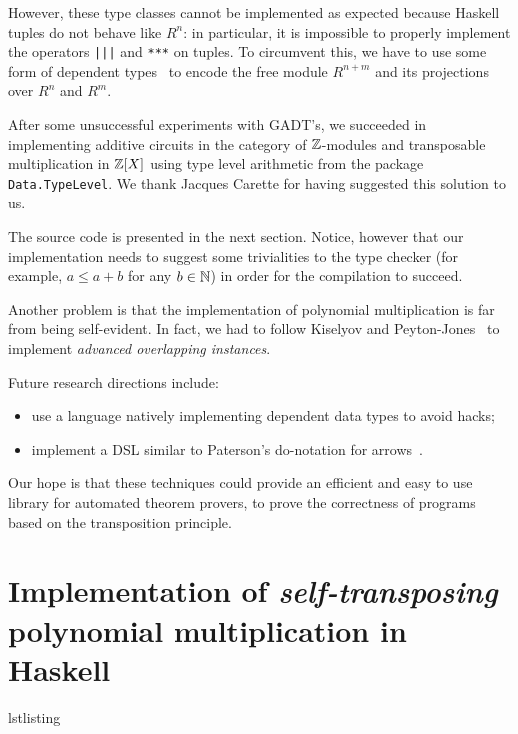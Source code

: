 However, these type classes cannot be implemented as expected because
Haskell tuples do not behave like $R^n$: in particular, it is
impossible to properly implement the operators \lstinline+|||+ and
\lstinline+***+ on tuples. To circumvent this, we have to use some
form of dependent types~\cite{kiselyov+lammel+schupke04,mcbride01} to
encode the free module $R^{n+m}$ and its projections over $R^n$ and
$R^m$.

After some unsuccessful experiments with GADT's, we succeeded in
implementing additive circuits in the category of $\mathbb{Z}$-modules and
transposable multiplication in $\mathbb{Z}[X]$ using type level arithmetic
from the package \lstinline+Data.TypeLevel+. We thank Jacques Carette
for having suggested this solution to us.

The source code is presented in the next section. Notice, however that
our implementation needs to suggest some trivialities to the type
checker (for example, $a\le a+b$ for any $b\in\mathbb{N}$) in order for the
compilation to succeed. 

Another problem is that the implementation of polynomial
multiplication is far from being self-evident. In fact, we had to
follow Kiselyov and
Peyton-Jones~\cite{jones+kiselyov:advanced+overlap08} to implement
\emph{advanced overlapping instances}.

Future research directions include:
\begin{itemize}
\item use a language natively implementing dependent data types to
  avoid hacks;
\item implement a DSL similar to Paterson's do-notation for
  arrows~\cite{paterson01}.
\end{itemize}
Our hope is that these techniques could provide an efficient and easy
to use library for automated theorem provers, to prove the correctness
of programs based on the transposition principle.


\section[\emph{Self-transposing} polynomial
multiplication]{Implementation of \emph{self-transposing} polynomial
  multiplication in Haskell}
\label{sec:impl-emphs-transp}

\begin{xcomment}{lstlisting}

\end{xcomment}



\renewcommand{\C}{\mathbb{C}}



%
